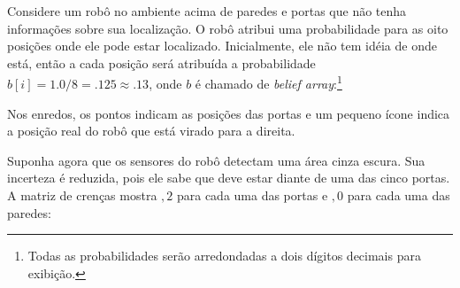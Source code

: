 Considere um robô no ambiente acima de paredes e portas que não tenha informações sobre sua localização. O robô atribui uma probabilidade para as oito posições onde ele pode estar localizado. Inicialmente, ele não tem idéia de onde está, então a cada posição será atribuída a probabilidade $b[i]=1.0/8=.125\approx .13$, onde $b$ é chamado de \emph{belief array}:\footnote{Todas as probabilidades serão arredondadas a dois dígitos decimais para exibição.}
\begin{center}
\end{center}

Nos enredos, os pontos indicam as posições das portas e um pequeno ícone indica a posição real do robô que está virado para a direita.

Suponha agora que os sensores do robô detectam uma área cinza escura. Sua incerteza é reduzida, pois ele sabe que deve estar diante de uma das cinco portas. A matriz de crenças mostra $,2$ para cada uma das portas e $,0$ para cada uma das paredes:
\begin{center}
\end{center}

